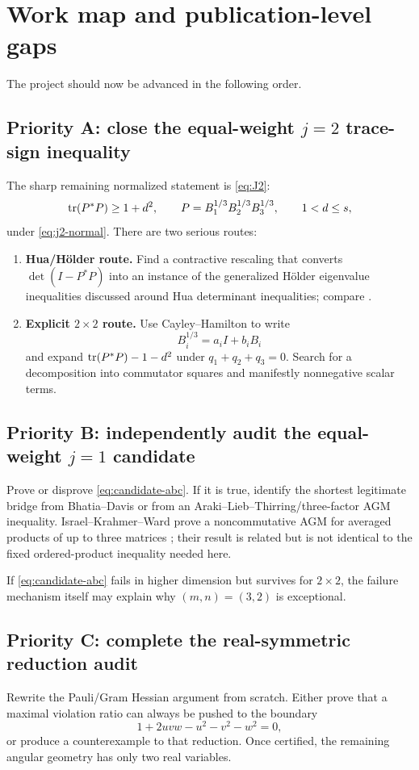 \section{Work map and publication-level gaps}

The project should now be advanced in the following order.

\subsection*{Priority A: close the equal-weight $j=2$ trace-sign inequality}
The sharp remaining normalized statement is \eqref{eq:J2}:
\[
\operatorname{tr}(P^*P)\ge 1+d^2,
\qquad
P=B_1^{1/3}B_2^{1/3}B_3^{1/3},
\qquad
1<d\le s,
\]
under \eqref{eq:j2-normal}.  There are two serious routes:
\begin{enumerate}[leftmargin=2.2em]
\item \textbf{Hua/H\"older route.}  Find a contractive rescaling that converts $\det(I-P^*P)$ into an instance of the generalized H\"older eigenvalue inequalities discussed around Hua determinant inequalities; compare \cite{Lin2024}.
\item \textbf{Explicit $2\times2$ route.}  Use Cayley--Hamilton to write
\[
B_i^{1/3}=a_iI+b_iB_i
\]
and expand $\operatorname{tr}(P^*P)-1-d^2$ under $q_1+q_2+q_3=0$.  Search for a decomposition into commutator squares and manifestly nonnegative scalar terms.
\end{enumerate}

\subsection*{Priority B: independently audit the equal-weight $j=1$ candidate}
Prove or disprove \eqref{eq:candidate-abc}.  If it is true, identify the shortest legitimate bridge from Bhatia--Davis or from an Araki--Lieb--Thirring/three-factor AGM inequality.  Israel--Krahmer--Ward prove a noncommutative AGM for averaged products of up to three matrices \cite{IsraelKrahmerWard2016}; their result is related but is not identical to the fixed ordered-product inequality needed here.

If \eqref{eq:candidate-abc} fails in higher dimension but survives for $2\times2$, the failure mechanism itself may explain why $(m,n)=(3,2)$ is exceptional.

\subsection*{Priority C: complete the real-symmetric reduction audit}
Rewrite the Pauli/Gram Hessian argument from scratch.  Either prove that a maximal violation ratio can always be pushed to the boundary
\[
1+2uvw-u^2-v^2-w^2=0,
\]
or produce a counterexample to that reduction.  Once certified, the remaining angular geometry has only two real variables.

